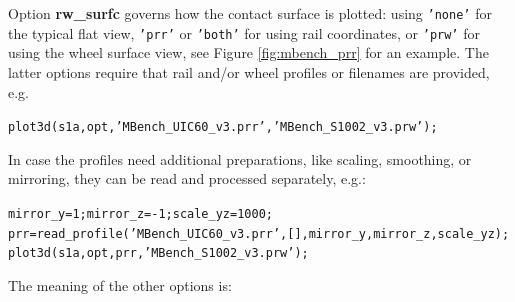 \documentclass[12pt]{report}
\begin{document}
Option {\bf rw\_surfc} governs how the contact surface is plotted: using
{\tt 'none'} for the typical flat view, {\tt 'prr'} or {\tt 'both'} for
using rail coordinates, or {\tt 'prw'} for using the wheel surface view,
see Figure \ref{fig:mbench_prr} for an example. The latter options require
that rail and/or wheel profiles or filenames are provided, e.g.\
\begin{alltt}\small
  plot3d( s1a, opt, 'MBench_UIC60_v3.prr', 'MBench_S1002_v3.prw' );
\end{alltt}
In case the profiles need additional preparations, like scaling, smoothing,
or mirroring, they can be read and processed separately, e.g.:
\begin{alltt}\small
  mirror_y = 1; mirror_z = -1; scale_yz = 1000;
  prr = read_profile('MBench_UIC60_v3.prr', [], mirror_y, mirror_z, scale_yz);
  plot3d( s1a, opt, prr, 'MBench_S1002_v3.prw' );
\end{alltt}
The meaning of the other options is:
\end{document}
